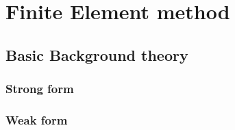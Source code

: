 \chapter{Finite Element method}
\section{Basic Background theory}
\subsection{Strong form}
\subsection{Weak form}